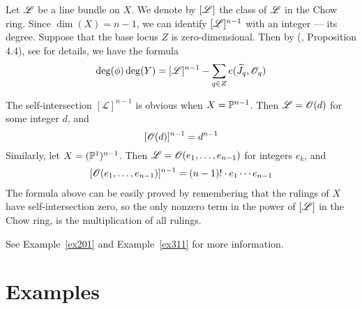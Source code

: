 \documentclass[fleqn,reqno]{amsart}
\begin{document}
\begin{paragraf}
Let $\mathscr{L}$ be a line bundle on $X$.
We denote by $[\mathscr{L}]$ the class of $\mathscr{L}$ in the Chow ring.
Since $\dim(X)=n-1$, we can identify $[\mathscr{L}]^{n-1}$ with an integer --- its degree.
Suppose that the base locus $Z$ is zero-dimensional.
Then by (\citet{Ful84}, Proposition 4.4), see \citet{Cox-01} for details,
we have the formula
\begin{align}
	\label{eq:degree-formula}
	\deg(\phi)\deg(Y)=[\mathscr L]^{n-1}-\sum_{q\in Z}e(\widetilde{J}_q,\mathscr{O}_q)
\end{align}
\end{paragraf}

\begin{paragraf}
\label{par:self-intersection}
The self-intersection $[\mathscr L]^{n-1}$ is obvious when $X=\mathbb{P}^{n-1}$.
Then $\mathscr L=\mathscr{O}(d)$ for some integer $d$, and
\[
	[\mathscr{O}(d)]^{n-1}=d^{n-1}
\]
Similarly, let $X=(\mathbb{P}^1)^{n-1}$. Then $\mathscr{L}=\mathscr{O}(e_1,\ldots,e_{n-1})$ for integers $e_k$,
and
\begin{align}
	\label{eq:formula-prod-P1}
	[\mathscr{O}(e_1,\ldots,e_{n-1})]^{n-1}=(n-1)!\cdot e_1\cdots e_{n-1}
\end{align}
The formula above can be easily proved by remembering that the rulings of $X$ have
self-intersection zero,
so the only nonzero term in the power of $[\mathscr{L}]$ in the Chow ring, is the multiplication
of all rulings.
\end{paragraf}

\begin{paragraf*}
See Example~\ref{ex201} and Example~\ref{ex311} for more information.
\end{paragraf*}


\section{Examples}
\label{sec:def-examples}
\end{document}

